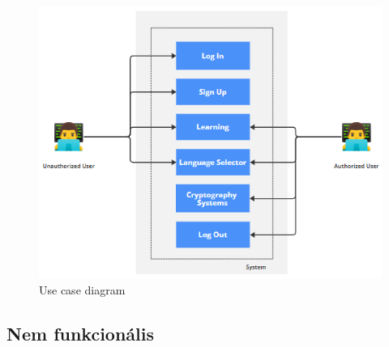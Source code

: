 \begin{figure}[!h]
	\centering
	\includegraphics[scale=0.6]{images/UseCaseDiagram}
	\caption{Use case diagram}
	\label{fig:usecase}
\end{figure}


\newpage
\subsection{Nem funkcionális}

